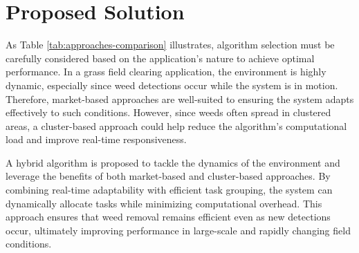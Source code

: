 \begin{table}[H]
    \centering
    \renewcommand{\arraystretch}{1.3} %
    \caption{A Comparison of different approaches to \ac{TA}, Source \cite{10.1145/3700591}}
    \label{tab:approaches-comparison}
\end{table}

\section{Proposed Solution}
As Table \ref{tab:approaches-comparison} illustrates, algorithm selection must be carefully considered based on the application's nature to achieve optimal performance. In a grass field clearing application, the environment is highly dynamic, especially since weed detections occur while the system is in motion. Therefore, market-based approaches are well-suited to ensuring the system adapts effectively to such conditions. However, since weeds often spread in clustered areas, a cluster-based approach could help reduce the algorithm's computational load and improve real-time responsiveness.

A hybrid algorithm is proposed to tackle the dynamics of the environment and leverage the benefits of both market-based and cluster-based approaches. By combining real-time adaptability with efficient task grouping, the system can dynamically allocate tasks while minimizing computational overhead. This approach ensures that weed removal remains efficient even as new detections occur, ultimately improving performance in large-scale and rapidly changing field conditions.